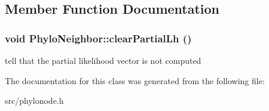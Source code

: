 \subsection{Member Function Documentation}
\hypertarget{classPhyloNeighbor_a361b1d766721309ab38f6c4ea028adf5}{
\subsubsection[{clearPartialLh}]{\setlength{\rightskip}{0pt plus 5cm}void PhyloNeighbor::clearPartialLh ()}}
\label{classPhyloNeighbor_a361b1d766721309ab38f6c4ea028adf5}
tell that the partial likelihood vector is not computed 

The documentation for this class was generated from the following file:\begin{DoxyCompactItemize}
\item 
src/phylonode.h\end{DoxyCompactItemize}
